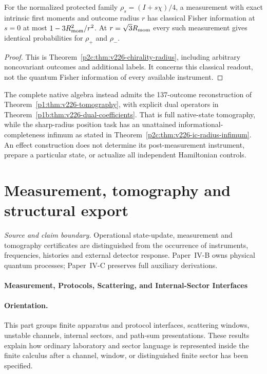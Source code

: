 \documentclass[12pt,a4paper]{article}
\begin{document}
\begin{corollary}
\label{p4:cor:v226-chirality-fisher}
For the normalized protected family $\rho_s=(I+s\chi)/4$, a measurement
with exact intrinsic first moments and outcome radius $r$ has classical
Fisher information at $s=0$ at most $1-3R_{\rm mom}^2/r^2$.
At $r=\sqrt3R_{\rm mom}$ every such measurement gives identical
probabilities for $\rho_+$ and $\rho_-$.
\end{corollary}
\begin{proof}
This is Theorem~\ref{p2c:thm:v226-chirality-radius}, including arbitrary
noncovariant outcomes and additional labels. It concerns this classical
readout, not the quantum Fisher information of every available instrument.
\end{proof}
The complete native algebra instead admits the 137-outcome reconstruction
of Theorem~\ref{p1:thm:v226-tomography}, with explicit dual operators in
Theorem~\ref{p1b:thm:v226-dual-coefficients}. That is full native-state
tomography, while the sharp-radius position task has an unattained
informational-completeness infimum as stated in
Theorem~\ref{p2c:thm:v226-ic-radius-infimum}.
An effect construction does not determine its post-measurement instrument,
prepare a particular state, or actualize all independent Hamiltonian controls.




\section{Measurement, tomography and structural export}
\label{p4a:sec:v238-a8}
\noindent\textit{Source and claim boundary.} Operational state-update, measurement and tomography certificates are distinguished from the occurrence of instruments, frequencies, histories and external detector response. Paper~IV-B owns physical quantum processes; Paper~IV-C preserves full auxiliary derivations.

\paragraph{Measurement, Protocols, Scattering, and Internal-Sector Interfaces}
\label{p4:part:measurement-scattering-internal}

\paragraph{Orientation.}
This part groups finite apparatus and protocol interfaces, scattering windows, unstable channels, internal sectors, and path-sum presentations.  These results explain how ordinary laboratory and sector language is represented inside the finite calculus after a channel, window, or distinguished finite sector has been specified.
\end{document}
